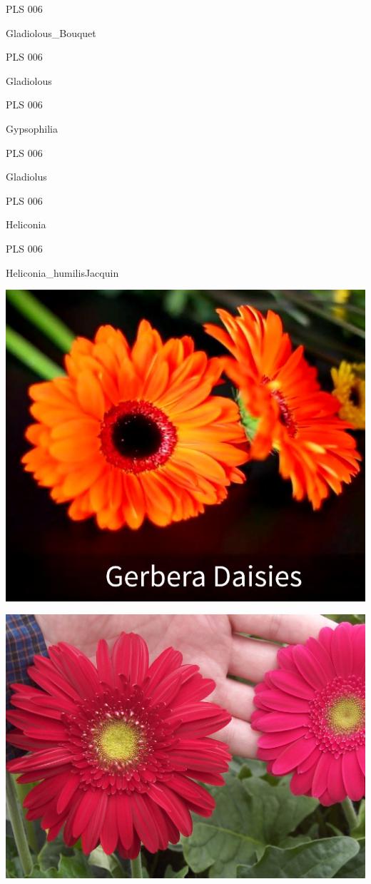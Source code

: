 \documentclass{article}
\begin{document}
\noindent  PLS 006
\vfill
\centerline{{\huge Gladiolous\_Bouquet }}
\vfill
\newpage

\noindent  PLS 006
\vfill
\centerline{{\huge Gladiolous }}
\vfill
\newpage

\noindent  PLS 006
\vfill
\centerline{{\huge Gypsophilia }}
\vfill
\newpage

\noindent  PLS 006
\vfill
\centerline{{\huge Gladiolus }}
\vfill
\newpage

\noindent  PLS 006
\vfill
\centerline{{\huge Heliconia }}
\vfill
\newpage

\noindent  PLS 006
\vfill
\centerline{{\huge Heliconia\_humilisJacquin }}
\vfill
\newpage

\begin{center}
\includegraphics[height=0.925\paperheight]{../Gerbera_Daisies.jpg}
\end{center}
\newpage

\begin{center}
\includegraphics[height=0.925\paperheight]{../Gerbera_PassionMaya.jpg}
\end{center}
\newpage
\end{document}
